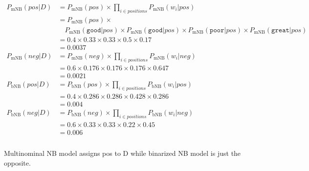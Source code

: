 \documentclass{article}
\begin{document}
\begin{align*}
    P_{\text{mNB}}(pos|D) & = P_{\text{mNB}}(pos) \times \prod_{i \in positions}P_{\text{mNB}}(w_i|pos)      \\
                          & = P_{\text{mNB}}(pos) \times                                                     \\
                          & \quad P_{\text{mNB}}(\texttt{good}|pos) \times P_{\text{mNB}}(\texttt{good}|pos)
    \times P_{\text{mNB}}(\texttt{poor}|pos) \times P_{\text{mNB}}(\texttt{great}|pos)                       \\
                          & = 0.4 \times 0.33 \times 0.33 \times 0.5 \times 0.17                             \\
                          & = 0.0037                                                                         \\
    P_{\text{mNB}}(neg|D) & = P_{\text{mNB}}(neg) \times \prod_{i \in positions}P_{\text{mNB}}(w_i|neg)      \\
                          & = 0.6 \times 0.176 \times 0.176 \times 0.176 \times 0.647                        \\
                          & = 0.0021                                                                         \\
    P_{\text{bNB}}(pos|D) & = P_{\text{bNB}}(pos) \times \prod_{i \in positions}P_{\text{bNB}}(w_i|pos)      \\
                          & = 0.4 \times 0.286 \times 0.286 \times 0.428 \times 0.286                        \\
                          & = 0.004                                                                          \\
    P_{\text{bNB}}(neg|D) & = P_{\text{bNB}}(neg) \times \prod_{i \in positions}P_{\text{bNB}}(w_i|neg)      \\
                          & = 0.6 \times 0.33 \times 0.33 \times 0.22 \times 0.45                            \\
                          & = 0.006                                                                          \\
\end{align*}

\paragraph*{}
Multinominal NB model assigns pos to D while binarized NB model is just the opposite.
\end{document}

